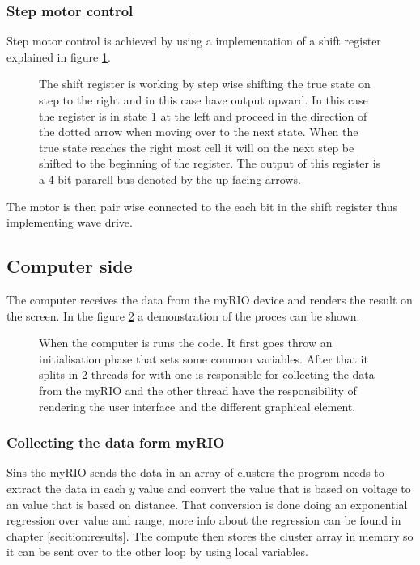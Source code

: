 \subsubsection{Step motor control}\label{subsubsection:Step-control}
Step motor control is achieved by using a implementation of a shift register explained in figure \ref{fig:shift-reg}. 

\begin{figure}[ht]
  \centering
  
  \caption{The shift register is working by step wise shifting the true state on step to the right and in this case have output upward. In this case the register is in state 1 at the left and proceed in the direction of the dotted arrow when moving over to the next state. When the true state reaches the right most cell it will on the next step be shifted to the beginning of the register. The output of this register is a 4 bit pararell bus denoted by the up facing arrows.}
  \label{fig:shift-reg}
\end{figure}
The motor is then pair wise connected to the each bit in the shift register thus implementing wave drive.

\subsection{Computer side}\label{subsection:computer-side}
The computer receives the data from the myRIO device and renders the result on the screen. In the figure \ref{fig:data-recive} a demonstration of the proces can be shown.

\begin{figure}[ht]
    \centering
   
  \caption{When the computer is runs the code. It first goes throw an initialisation phase that sets some common variables. After that it splits in 2 threads for with one is responsible for collecting the data from the myRIO and the other thread have the responsibility of rendering the user interface and the different graphical element.}
  \label{fig:data-recive}
\end{figure}

\subsubsection{Collecting the data form myRIO}\label{subsubsection:collectData}
Sins the myRIO sends the data in an array of clusters the program needs to extract the data in each $y$ value and convert the value that is based on voltage to an value that is based on distance. That conversion is done doing an exponential regression over value and range, more info about the regression can be found in chapter \ref{secition:results}. The compute then stores the cluster array in memory so it can be sent over to the other loop by using local variables.

